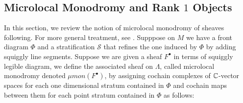 \subsection*{Microlocal Monodromy and Rank $1$ Objects}
In this section, we review the notion of microlocal monodromy of sheaves following\cite[Section~5.1]{shende2017legendrian}. For more general treatment, see \cite[Ch.~\MakeUppercase{\Rn{4}}]{kashiwara2013sheaves}. Supppose on $M$ we have a front diagram $\Phi$ and a stratification $\mathcal{S}$ that refines the one induced by $\Phi$ by adding squiggly line segments. Suppose we are given a sheaf $F^\bullet$ in terms of squiggly legible diagram, we define the associated sheaf on $\Lambda$, called microlocal monodromy denoted $\mu mon (F^\bullet)$, by assigning cochain complexes of $\mathbb{C}$-vector spaces for each one dimensional stratum contained in $\Phi$ and cochain maps between them for each point stratum contained in $\Phi$ as follows:
